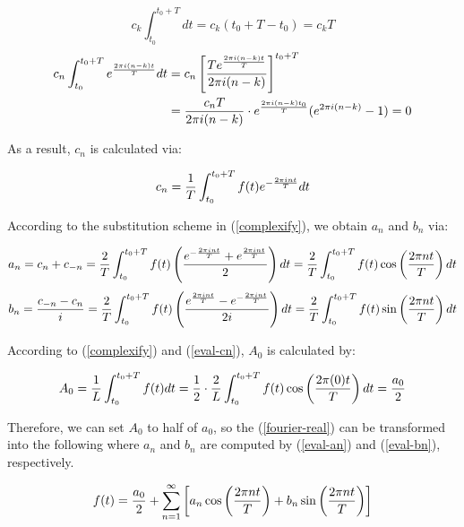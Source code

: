 \begin{equation}
	c_k\int_{t_0}^{t_0+T}dt=c_k(t_0+T-t_0)=c_kT
	\label{eq-k-case}
\end{equation}
\begin{equation}
	\begin{aligned}
		c_n\int_{t_0}^{t_0+T}e^{2\pi i(n-k)t\over T}dt
		&=c_n\left[Te^{2\pi i(n-k)t\over T}\over2\pi i(n-k)\right]
		^{t_0+T} \\
		&={c_nT\over2\pi i(n-k)}\cdot e^{2\pi i(n-k)t_0\over T}
		(e^{2\pi i(n-k)}-1)=0
	\end{aligned}
	\label{neq-k-case}
\end{equation}

As a result, $c_n$ is calculated via:

\begin{equation}
	c_n={1\over T}\int_{t_0}^{t_0+T}f(t)e^{-{2\pi int\over T}}dt
	\label{eval-cn}
\end{equation}

According to the substitution scheme in (\ref{complexify}), we obtain $a_n$ and
$b_n$ via:

\begin{equation}
	a_n=c_n+c_{-n}={2\over T}\int_{t_0}^{t_0+T}f(t)
	\left(e^{-{2\pi int\over T}}+e^{2\pi int\over T}\over 2\right)dt
	={2\over T}\int_{t_0}^{t_0+T}f(t)\cos\left(2\pi nt\over T\right)dt
	\label{eval-an}
\end{equation}
\begin{equation}
	b_n={c_{-n}-c_n\over i}={2\over T}\int_{t_0}^{t_0+T}f(t)
	\left(e^{2\pi int\over T}-e^{-{2\pi int\over T}}\over2i\right)dt
	={2\over T}\int_{t_0}^{t_0+T}f(t)\sin\left(2\pi nt\over T\right)dt
	\label{eval-bn}
\end{equation}

According to (\ref{complexify}) and (\ref{eval-cn}), $A_0$ is calculated by:

$$
A_0={1\over L}\int_{t_0}^{t_0+T}f(t)dt
={1\over2}\cdot{2\over L}\int_{t_0}^{t_0+T}f(t)
\cos\left(2\pi(0)t\over T\right)dt
={a_0\over2}
$$

Therefore, we can set $A_0$ to half of $a_0$, so the (\ref{fourier-real}) can
be transformed into the following where $a_n$ and $b_n$ are computed by
(\ref{eval-an}) and (\ref{eval-bn}), respectively.

$$
f(t)={a_0\over2}+\sum_{n=1}^\infty\left[a_n\cos\left({2\pi nt\over T}\right)
+b_n\sin\left({2\pi nt\over T}\right)\right]
$$
